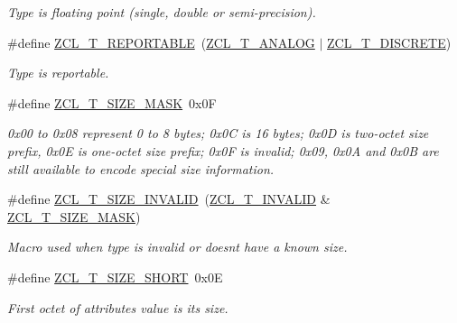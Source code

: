 \begin{DoxyCompactItemize}
\begin{DoxyCompactList}\small\item\em Type is floating point (single, double or semi-\/precision). \end{DoxyCompactList}\item 
\#define \hyperlink{group__zcl__types_gab0e5c23a0877c17fde12043c85728c29}{Z\+C\+L\+\_\+\+T\+\_\+\+R\+E\+P\+O\+R\+T\+A\+B\+LE}~(\hyperlink{group__zcl__types_ga7b609984d4662f83a2248d1f485fd4ad}{Z\+C\+L\+\_\+\+T\+\_\+\+A\+N\+A\+L\+OG} $\vert$ \hyperlink{group__zcl__types_ga3e9bf95af4f58a0c9c5c34639b0dda29}{Z\+C\+L\+\_\+\+T\+\_\+\+D\+I\+S\+C\+R\+E\+TE})
\begin{DoxyCompactList}\small\item\em Type is reportable. \end{DoxyCompactList}\item 
\#define \hyperlink{group__zcl__types_gaa49518f03f9632a55b3e1c4d4c68b60c}{Z\+C\+L\+\_\+\+T\+\_\+\+S\+I\+Z\+E\+\_\+\+M\+A\+SK}~0x0F
\begin{DoxyCompactList}\small\item\em 0x00 to 0x08 represent 0 to 8 bytes; 0x0C is 16 bytes; 0x0D is two-\/octet size prefix, 0x0E is one-\/octet size prefix; 0x0F is invalid; 0x09, 0x0A and 0x0B are still available to encode special size information. \end{DoxyCompactList}\item 
\mbox{\label{group__zcl__types_ga5f381526f4ac9adac8cb07b7135e737d}} 
\#define \hyperlink{group__zcl__types_ga5f381526f4ac9adac8cb07b7135e737d}{Z\+C\+L\+\_\+\+T\+\_\+\+S\+I\+Z\+E\+\_\+\+I\+N\+V\+A\+L\+ID}~(\hyperlink{group__zcl__types_ga7609ed68cf4399cb2c09799ecedfdbe0}{Z\+C\+L\+\_\+\+T\+\_\+\+I\+N\+V\+A\+L\+ID} \& \hyperlink{group__zcl__types_gaa49518f03f9632a55b3e1c4d4c68b60c}{Z\+C\+L\+\_\+\+T\+\_\+\+S\+I\+Z\+E\+\_\+\+M\+A\+SK})
\begin{DoxyCompactList}\small\item\em Macro used when type is invalid or doesn\textquotesingle{}t have a known size. \end{DoxyCompactList}\item 
\mbox{\label{group__zcl__types_ga5121bb1f631a19b8a50980325ee67c26}} 
\#define \hyperlink{group__zcl__types_ga5121bb1f631a19b8a50980325ee67c26}{Z\+C\+L\+\_\+\+T\+\_\+\+S\+I\+Z\+E\+\_\+\+S\+H\+O\+RT}~0x0E
\begin{DoxyCompactList}\small\item\em First octet of attribute\textquotesingle{}s value is its size. \end{DoxyCompactList}\item 

\end{DoxyCompactItemize}
